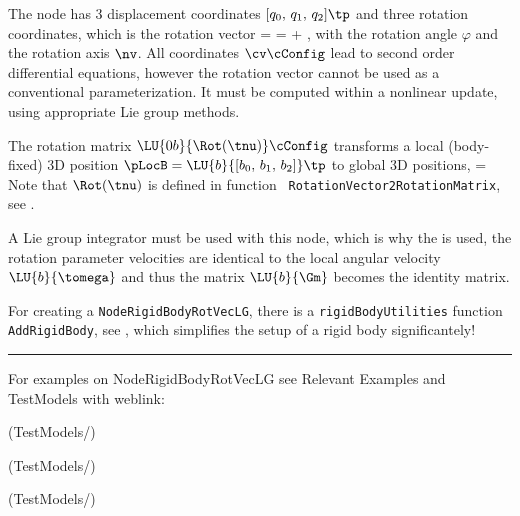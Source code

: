     The node has 3 displacement coordinates $[q_0,\,q_1,\,q_2]\tp$ and three rotation coordinates, which is the rotation vector 
    \be
      \tnu = \varphi \nv = \tnu\cConfig + \tnu\cRef,
    \ee
    with the rotation angle $\varphi$ and the rotation axis $\nv$.
    All coordinates $\cv\cConfig$ lead to second order differential equations, however the rotation vector cannot be used as a conventional parameterization. It must be computed within a nonlinear update, using appropriate Lie group methods.

    The rotation matrix $\LU{0b}{\Rot(\tnu)}\cConfig$ transforms a local (body-fixed) 3D position 
    $\pLocB = \LU{b}{[b_0,\,b_1,\,b_2]}\tp$ to global 3D positions,
    \be
      \cConfig = \cConfig {} 
    \ee
    Note that $\Rot(\tnu)$ is defined in function \texttt{ RotationVector2RotationMatrix}, see .
    
    A Lie group integrator must be used with this node, which is why the is used, the 
    rotation parameter velocities are identical to the local angular velocity $\LU{b}{\tomega}$ and thus the 
    matrix $ \LU{b}{\Gm}$ becomes the identity matrix.
    
    For creating a \texttt{NodeRigidBodyRotVecLG}, there is a \texttt{rigidBodyUtilities} function \texttt{AddRigidBody}, 
    see , which simplifies the setup of a rigid body significantely!
\vspace{6pt}\par\noindent\rule{\textwidth}{0.4pt}
%
\noindent For examples on NodeRigidBodyRotVecLG see Relevant Examples and TestModels with weblink:
\bi
\item {} (TestModels/)
\item {} (TestModels/)
\item {} (TestModels/)

